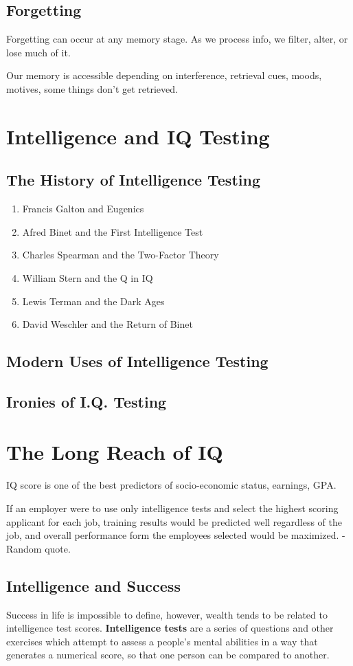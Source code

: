 \documentclass[12pt]{article}
\begin{document}
\subsection*{Forgetting}
Forgetting can occur at any memory stage. As we process info, we filter, alter, or lose much of it. 

Our memory is accessible depending on interference, retrieval cues, moods, motives, some things don't get retrieved. 

\section*{Intelligence and IQ Testing}
\subsection*{The History of Intelligence Testing}
\begin{enumerate}
  \item Francis Galton and Eugenics
  \item Afred Binet and the First Intelligence Test
  \item Charles Spearman and the Two-Factor Theory
  \item William Stern and the Q in IQ
  \item Lewis Terman and the Dark Ages
  \item David Weschler and the Return of Binet
\end{enumerate}
\subsection*{Modern Uses of Intelligence Testing}
\subsection*{Ironies of I.Q. Testing}

\section*{The Long Reach of IQ}
IQ score is one of the best predictors of socio-economic status, earnings, GPA.

If an employer were to use only intelligence tests and select the highest scoring applicant for each job, training results would be predicted well regardless of the job, and overall performance form the employees selected would be maximized. - Random quote.

\subsection*{Intelligence and Success}
Success in life is impossible to define, however, wealth tends to be related to intelligence test scores. \textbf{Intelligence tests} are a series of questions and other exercises which attempt to assess a people's mental abilities in a way that generates a numerical score, so that one person can be compared to another. 
\end{document}
